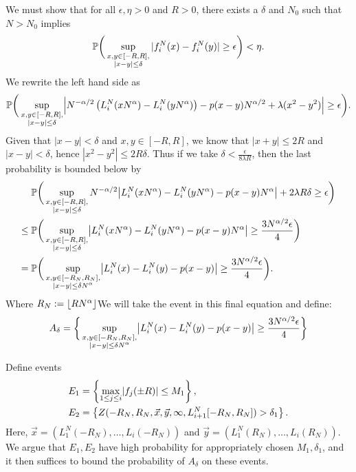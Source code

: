 	We must show that for all $\epsilon,\eta>0$ and $R>0$, there exists a $\delta$ and $N_0$ such that $N>N_0$ implies 
	\[
	\mathbb{P}\bigg(\sup_{\substack{x,y\in [-R,R],\\ |x-y|\leq\delta}} |f^N_i(x) - f^N_i(y)| \geq \epsilon\bigg)<\eta.
	\]
	We rewrite the left hand side as
	\begin{align}
	\pr\bigg(\sup_{\substack{x,y\in [-R,R],\\ |x-y|\leq\delta}} \abs*{N^{-\alpha/2}\left(L^N_i(xN^{\alpha}) - L^N_i(yN^\alpha)\right)-p(x-y)N^{\alpha/2}+\lambda(x^2-y^2)} \geq \epsilon\bigg).
	\end{align}
	Given that $|x-y|<\delta$ and $x,y\in [-R,R]$, we know that $|x+y|\leq 2R$ and $|x-y|<\delta$, hence $|x^2-y^2|\leq 2R\delta$. Thus if we take $\delta < \frac{\epsilon}{8\lambda R}$, then the last probability is bounded below by
	\begin{align*}
	&\pr\bigg(\sup_{\substack{x,y\in [-R,R],\\ |x-y|\leq\delta}} N^{-\alpha/2}\abs*{L_i^N(xN^\alpha)-L_i^N(yN^\alpha)-p(x-y)N^\alpha}+2\lambda R\delta\geq \epsilon\bigg)\\
	\leq \; & \pr\bigg(\sup_{\substack{x,y\in [-R,R],\\ |x-y|\leq\delta}} \abs*{L_i^N(xN^\alpha)-L_i^N(yN^\alpha)-p(x-y)N^\alpha}\geq \frac{3N^{\alpha/2}\epsilon}4\bigg)\\
	= \; & \pr\bigg(\sup_{\substack{x,y\in [-R_N,R_N],\\ |x-y|\leq \delta N^\alpha}} \abs*{L_i^N(x)-L_i^N(y)-p(x-y)}\geq \frac{3N^{\alpha/2}\epsilon}4\bigg).
	\end{align*}
	Where $R_N:=\lfloor RN^\alpha\rfloor$We will take the event in this final equation and define:
	\begin{equation}
	A_\delta =\bigg\{\sup_{\substack{x,y\in [-R_N,R_N],\\ |x-y|\leq \delta N^\alpha}} \abs*{L_i^N(x)-L_i^N(y)-p(x-y)}\geq \frac{3N^{\alpha/2}\epsilon}4\bigg\}
	\end{equation}
	
	Define events
	\begin{align*}
	E_1&=\left\{\max_{1\leq j \leq i}\abs*{f_j(\pm R)}\leq M_1\right\},\\
	E_2&=\left\{Z(-R_N, R_N, \vec x, \vec y, \infty, L_{i+1}^N[-R_N, R_N])>\delta_1\right\}.\label{BiasDef}
	\end{align*}
	Here, $\vec{x} = (L_1^N(-R_N),\dots,L_i(-R_N))$ and $\vec{y} = (L_1^N(R_N),\dots,L_i(R_N))$. We argue that $E_1,E_2$ have high probability for appropriately chosen $M_1,\delta_1$, and it then suffices to bound the probability of $A_\delta$ on these events.
	
